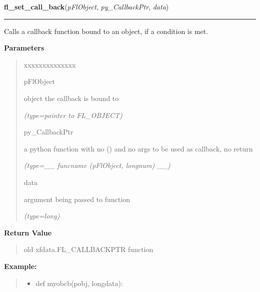 \hspace{.8\funcindent}\begin{boxedminipage}{\funcwidth}

    \raggedright \textbf{fl\_set\_call\_back}(\textit{pFlObject}, \textit{py\_CallbackPtr}, \textit{data})

    \vspace{-1.5ex}

    \rule{\textwidth}{0.5\fboxrule}
\setlength{\parskip}{2ex}
    Calls a callback function bound to an object, if a condition is met.

\setlength{\parskip}{1ex}
      \textbf{Parameters}
      \vspace{-1ex}

      \begin{quote}
        \begin{Ventry}{xxxxxxxxxxxxxx}

          \item[pFlObject]

          object the callback is bound to

            {\it (type=pointer to FL\_OBJECT)}

          \item[py\_CallbackPtr]

          a python function with no () and no args to be used as callback, 
          no return

            {\it (type=\_\_ funcname (pFlObject, longnum) \_\_)}

          \item[data]

          argument being passed to function

            {\it (type=long)}

        \end{Ventry}

      \end{quote}

      \textbf{Return Value}
    \vspace{-1ex}

      \begin{quote}
      old xfdata.FL\_CALLBACKPTR function

      \end{quote}

\textbf{Example:}
\begin{quote}
  \begin{itemize}

  \item
    \setlength{\parskip}{0.6ex}
def myobcb(pobj, longdata):




\end{itemize}
\end{quote}
\end{boxedminipage}
